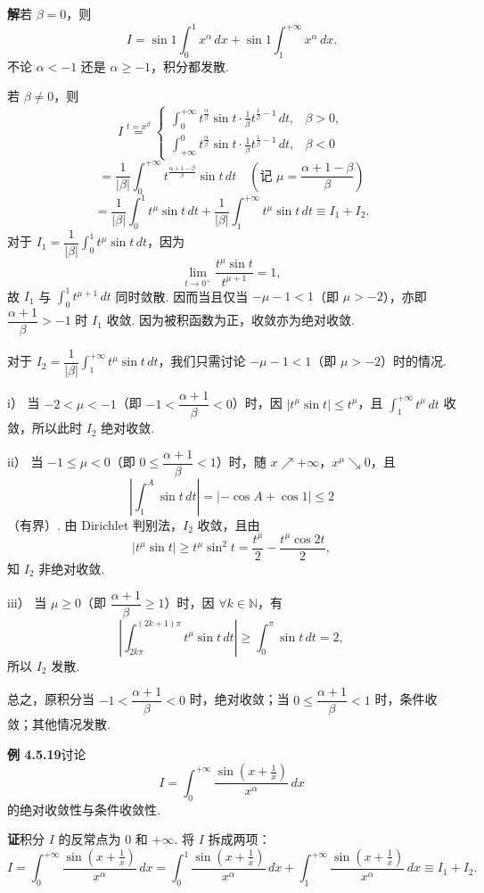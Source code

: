 \documentclass[UTF8,12pt,a4paper,fontset=fandol]{ctexart}
\begin{document}
\noindent\textbf{解}\quad 若 $\beta=0$，则
\[
I=\sin1\int_0^1x^\alpha\,dx+\sin1\int_1^{+\infty}x^\alpha\,dx.
\]
不论 $\alpha<-1$ 还是 $\alpha\ge-1$，积分都发散.

若 $\beta\ne0$，则
\[
I\stackrel{t=x^\beta}{=}
\begin{cases}
\displaystyle\int_0^{+\infty}t^{\frac\alpha\beta}\sin t\cdot\frac1\beta t^{\frac1\beta-1}\,dt,&\beta>0,\\[1.1em]
\displaystyle\int_{+\infty}^0t^{\frac\alpha\beta}\sin t\cdot\frac1\beta t^{\frac1\beta-1}\,dt,&\beta<0
\end{cases}
\]
\[
=\frac1{|\beta|}\int_0^{+\infty}t^{\frac{\alpha+1-\beta}{\beta}}\sin t\,dt
\quad\left(\text{记 }\mu=\frac{\alpha+1-\beta}{\beta}\right)
\]
\[
=\frac1{|\beta|}\int_0^1t^\mu\sin t\,dt
+\frac1{|\beta|}\int_1^{+\infty}t^\mu\sin t\,dt
\equiv I_1+I_2.
\]
对于 $I_1=\dfrac1{|\beta|}\int_0^1t^\mu\sin t\,dt$，因为
\[
\lim_{t\to0^+}\frac{t^\mu\sin t}{t^{\mu+1}}=1,
\]
故 $I_1$ 与 $\displaystyle\int_0^1t^{\mu+1}\,dt$ 同时敛散. 因而当且仅当 $-\mu-1<1$（即 $\mu>-2$），亦即 $\dfrac{\alpha+1}{\beta}>-1$ 时 $I_1$ 收敛. 因为被积函数为正，收敛亦为绝对收敛.

对于 $I_2=\dfrac1{|\beta|}\int_1^{+\infty}t^\mu\sin t\,dt$，我们只需讨论 $-\mu-1<1$（即 $\mu>-2$）时的情况.

i） 当 $-2<\mu<-1$（即 $-1<\dfrac{\alpha+1}{\beta}<0$）时，因 $|t^\mu\sin t|\le t^\mu$，且 $\displaystyle\int_1^{+\infty}t^\mu\,dt$ 收敛，所以此时 $I_2$ 绝对收敛.

ii） 当 $-1\le\mu<0$（即 $0\le\dfrac{\alpha+1}{\beta}<1$）时，随 $x\nearrow+\infty$，$x^\mu\searrow0$，且
\[
\left|\int_1^A\sin t\,dt\right|
=|-\cos A+\cos1|\le2
\]
（有界）. 由 Dirichlet 判别法，$I_2$ 收敛，且由
\[
|t^\mu\sin t|\ge t^\mu\sin^2t=\frac{t^\mu}{2}-\frac{t^\mu\cos2t}{2},
\]
知 $I_2$ 非绝对收敛.

iii） 当 $\mu\ge0$（即 $\dfrac{\alpha+1}{\beta}\ge1$）时，因 $\forall k\in\mathbb{N}$，有
\[
\left|\int_{2k\pi}^{(2k+1)\pi}t^\mu\sin t\,dt\right|
\ge\int_0^\pi\sin t\,dt=2,
\]
所以 $I_2$ 发散.

总之，原积分当 $-1<\dfrac{\alpha+1}{\beta}<0$ 时，绝对收敛；当 $0\le\dfrac{\alpha+1}{\beta}<1$ 时，条件收敛；其他情况发散.

\noindent\textbf{例 4.5.19}\quad 讨论
\[
I=\int_0^{+\infty}\frac{\sin\left(x+\frac1x\right)}{x^\alpha}\,dx
\]
的绝对收敛性与条件收敛性.

\noindent\textbf{证}\quad 积分 $I$ 的反常点为 $0$ 和 $+\infty$. 将 $I$ 拆成两项：
\[
I=\int_0^{+\infty}\frac{\sin\left(x+\frac1x\right)}{x^\alpha}\,dx
=\int_0^1\frac{\sin\left(x+\frac1x\right)}{x^\alpha}\,dx
+\int_1^{+\infty}\frac{\sin\left(x+\frac1x\right)}{x^\alpha}\,dx
\equiv I_1+I_2.
\]
\end{document}
